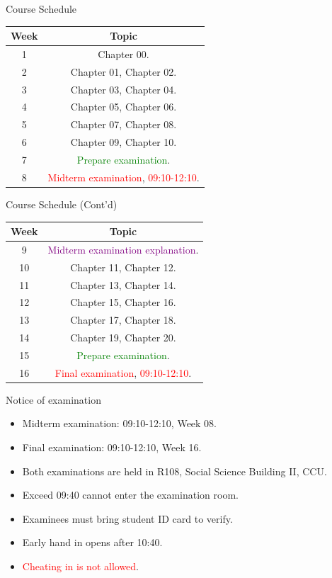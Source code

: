 \documentclass{beamer}
\begin{document}
\begin{frame}{Course Schedule}
\begin{center}
\begin{tabular}{|c|c|}
\hline
Week & Topic \\
\hline
1 & Chapter 00.\\
\hline
2 & Chapter 01, Chapter 02.\\
\hline
3 & Chapter 03, Chapter 04.\\
\hline
4 & Chapter 05, Chapter 06.\\
\hline
5 & Chapter 07, Chapter 08.\\
\hline
6 & Chapter 09, Chapter 10.\\
\hline
7 & \textcolor{Green}{Prepare examination}.\\
\hline
8 & \textcolor{red}{Midterm examination}, \textcolor{red}{09:10-12:10}.\\
\hline
\end{tabular}
\end{center}
\end{frame}
\begin{frame}{Course Schedule (Cont'd)}
\begin{center}
\begin{tabular}{|c|c|}
\hline
Week & Topic \\
\hline
9 & \textcolor{purple}{Midterm examination explanation}.\\
\hline
10 & Chapter 11, Chapter 12.\\
\hline
11 & Chapter 13, Chapter 14.\\
\hline
12 & Chapter 15, Chapter 16.\\
\hline
13 & Chapter 17, Chapter 18.\\
\hline
14 & Chapter 19, Chapter 20.\\
\hline
15 & \textcolor{Green}{Prepare examination}.\\
\hline
16 & \textcolor{red}{Final examination}, \textcolor{red}{09:10-12:10}.\\
\hline
\end{tabular}
\end{center}
\end{frame}
\begin{frame}{Notice of examination}
\begin{itemize}
\item Midterm examination: 09:10-12:10, Week 08.
\item Final examination: 09:10-12:10, Week 16.
\item Both examinations are held in R108, Social Science Building II, CCU.
\item Exceed 09:40 cannot enter the examination room.
\item Examinees must bring student ID card to verify.
\item Early hand in opens after 10:40.
\item \textcolor{red}{Cheating in is not allowed}.
\end{itemize}
\end{frame}
\end{document}
